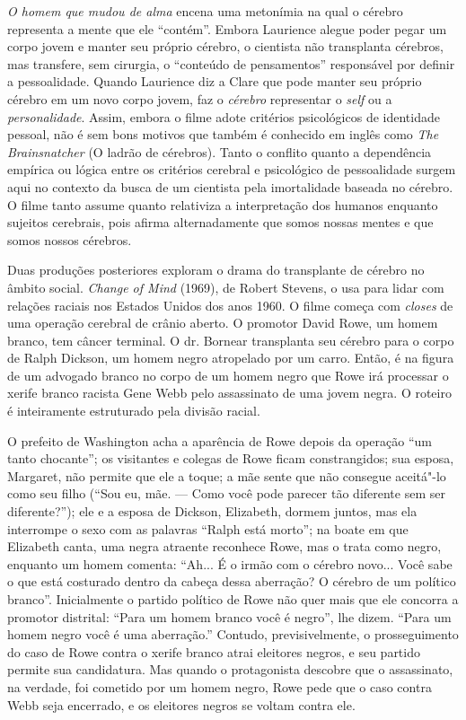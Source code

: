 \emph{O homem que mudou de alma} encena uma metonímia na qual o cérebro
representa a mente que ele ``contém''. Embora Laurience alegue poder
pegar um corpo jovem e manter seu próprio cérebro, o cientista não
transplanta cérebros, mas transfere, sem cirurgia, o ``conteúdo de
pensamentos'' responsável por definir a pessoalidade. Quando Laurience
diz a Clare que pode manter seu próprio cérebro em um novo corpo jovem,
faz o \emph{cérebro} representar o \emph{self} ou a
\emph{personalidade}. Assim, embora o filme adote critérios psicológicos
de identidade pessoal, não é sem bons motivos que também é conhecido em
inglês como \emph{The Brainsnatcher} (O ladrão de cérebros). Tanto o
conflito quanto a dependência empírica ou lógica entre os critérios
cerebral e psicológico de pessoalidade surgem aqui no contexto da busca
de um cientista pela imortalidade baseada no cérebro. O filme tanto
assume quanto relativiza a interpretação dos humanos enquanto sujeitos
cerebrais, pois afirma alternadamente que somos nossas mentes e que
somos nossos cérebros.

Duas produções posteriores exploram o drama do transplante de cérebro no
âmbito social. \emph{Change of Mind} (1969), de Robert Stevens, o usa
para lidar com relações raciais nos Estados Unidos dos anos 1960. O
filme começa com \emph{closes} de uma operação cerebral de crânio
aberto. O promotor David Rowe, um homem branco, tem câncer terminal. O
dr. Bornear transplanta seu cérebro para o corpo de Ralph Dickson, um
homem negro atropelado por um carro. Então, é na figura de um advogado
branco no corpo de um homem negro que Rowe irá processar o xerife branco
racista Gene Webb pelo assassinato de uma jovem negra. O roteiro é
inteiramente estruturado pela divisão racial.

O prefeito de Washington acha a aparência de Rowe depois da operação
``um tanto chocante''; os visitantes e colegas de Rowe ficam
constrangidos; sua esposa, Margaret, não permite que ele a toque; a mãe
sente que não consegue aceitá"-lo como seu filho (``Sou eu, mãe. --- Como
você pode parecer tão diferente sem ser diferente?''); ele e a esposa de
Dickson, Elizabeth, dormem juntos, mas ela interrompe o sexo com as
palavras ``Ralph está morto''; na boate em que Elizabeth canta, uma
negra atraente reconhece Rowe, mas o trata como negro, enquanto um homem
comenta: ``Ah... É o irmão com o cérebro novo... Você sabe o que está
costurado dentro da cabeça dessa aberração? O cérebro de um político
branco''. Inicialmente o partido político de Rowe não quer mais que ele
concorra a promotor distrital: ``Para um homem branco você é negro'',
lhe dizem. ``Para um homem negro você é uma aberração.'' Contudo,
previsivelmente, o prosseguimento do caso de Rowe contra o xerife branco
atrai eleitores negros, e seu partido permite sua candidatura. Mas
quando o protagonista descobre que o assassinato, na verdade, foi
cometido por um homem negro, Rowe pede que o caso contra Webb seja
encerrado, e os eleitores negros se voltam contra ele.

